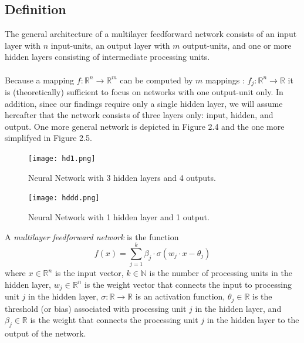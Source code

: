 \documentclass[../main.tex]{subfiles}
\begin{document}
	 \subsection{Definition}
	 \noindent The general architecture of a multilayer feedforward network consists of an input layer with $n$ input-units, an output layer with $m$ output-units, and one or more hidden layers consisting of intermediate processing units. \\ \\ Because a mapping
	 $f:\mathbb{R}^n \rightarrow \mathbb{R}^m$ can be computed by $m$ mappings :
	 $f_j: \mathbb{R}^n \rightarrow \mathbb{R}$ it is (theoretically) sufficient to focus on networks with one output-unit only. In addition, since our findings require only a single hidden layer, we will assume hereafter that the network consists of three layers only: input, hidden, and output. One more general network is depicted in Figure 2.4 and the one more simplifyed in Figure 2.5. 
	 
	 
	 \begin{figure}[h]
	 	\begin{minipage}[t]{0.45\textwidth}
	 		\centering
	 		\texttt{[image: hd1.png]}
	 		\caption{Neural Network with 3 hidden layers and 4 outputs.}
	 		\label{fig:imagen1}
	 	\end{minipage}\hfill
	 	\begin{minipage}[t]{0.45\textwidth}
	 		\centering
	 		\texttt{[image: hddd.png]}
	 		\caption{Neural Network with 1 hidden layer and 1 output.}
	 		\label{fig:imagen2}
	 	\end{minipage}
	 \end{figure}
	 
	 \begin{definition} A \textit{multilayer feedforward network} is the function
	 	$$f(x)=\sum_{j=1}^k \beta_j \cdot \sigma(w_j \cdot x - \theta_j)$$
	 	where $x \in \mathbb{R}^n$ is the input vector, $k \in \mathbb{N}$ is the number of processing units in the hidden layer, $w_j \in \mathbb{R}^n$ is the weight vector that connects the input to processing unit $j$ in the hidden layer, $\sigma : \mathbb{R} \rightarrow \mathbb{R}$ is an activation function, $\theta_j \in \mathbb{R}$ is the threshold (or bias) associated with processing unit $j$ in the hidden layer, and $\beta_j \in \mathbb{R}$ is the weight that connects the processing unit $j$ in the hidden layer to the output of the network.
	 	
	 	
	 \end{definition}
	 
\end{document}
